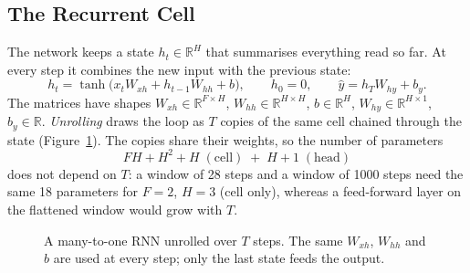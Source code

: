 \documentclass[11pt, a4paper]{article}
\begin{document}
\subsection{The Recurrent Cell}
\label{sec:cell}

The network keeps a state $h_t\in\mathbb{R}^H$ that summarises everything read so far. At every step it combines the new input with the previous state:
\begin{equation}
h_t=\tanh\big(x_tW_{xh}+h_{t-1}W_{hh}+b\big),\qquad h_0=0,\qquad \hat y=h_TW_{hy}+b_y .
\label{eq:rnn}
\end{equation}
The matrices have shapes $W_{xh}\in\mathbb{R}^{F\times H}$, $W_{hh}\in\mathbb{R}^{H\times H}$, $b\in\mathbb{R}^{H}$, $W_{hy}\in\mathbb{R}^{H\times1}$, $b_y\in\mathbb{R}$.
\emph{Unrolling} draws the loop as $T$ copies of the same cell chained through the state (Figure~\ref{fig:unroll}). The copies share their weights, so the number of parameters
\begin{equation}
FH+H^2+H\;(\text{cell})\;+\;H+1\;(\text{head})
\end{equation}
does not depend on $T$: a window of 28 steps and a window of 1000 steps need the same 18 parameters for $F=2$, $H=3$ (cell only), whereas a feed-forward layer on the flattened window
would grow with $T$.

\begin{figure}[H]
\centering
{}
\caption{A many-to-one RNN unrolled over $T$ steps. The same $W_{xh}$, $W_{hh}$ and $b$ are used at every step; only the last state feeds the output.}
\label{fig:unroll}
\end{figure}
\end{document}
